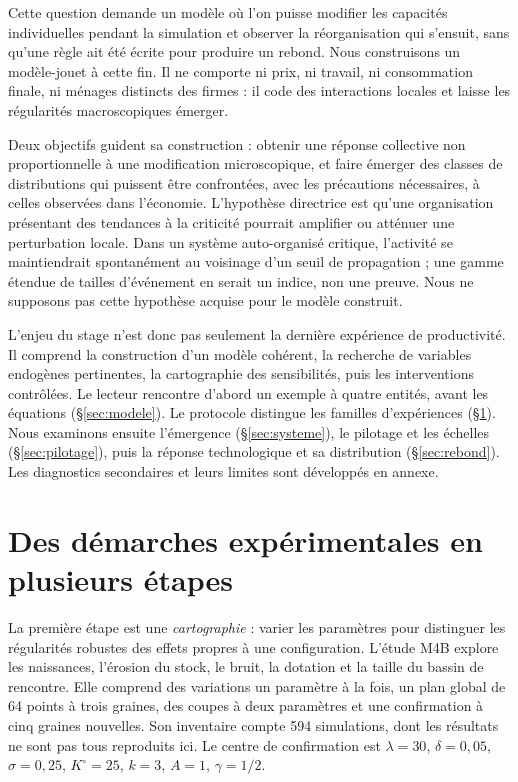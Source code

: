 Cette question demande un modèle où l'on puisse modifier les capacités
individuelles pendant la simulation et observer la réorganisation qui
s'ensuit, sans qu'une règle ait été écrite pour produire un rebond. Nous
construisons un modèle-jouet à cette fin. Il ne comporte ni prix, ni travail,
ni consommation finale, ni ménages distincts des firmes : il code des
interactions locales et laisse les régularités macroscopiques émerger.

Deux objectifs guident sa construction : obtenir une réponse collective
non proportionnelle à une modification microscopique, et faire émerger des
classes de distributions qui puissent être confrontées, avec les précautions
nécessaires, à celles observées dans l'économie. L'hypothèse directrice est
qu'une organisation présentant des tendances à la criticité pourrait amplifier
ou atténuer une perturbation locale. Dans un système auto-organisé critique,
l'activité se maintiendrait spontanément au voisinage d'un seuil de propagation ;
une gamme étendue de tailles d'événement en serait un indice, non une preuve.
Nous ne supposons pas cette hypothèse acquise pour le modèle construit.

L'enjeu du stage n'est donc pas seulement la dernière expérience de
productivité. Il comprend la construction d'un modèle cohérent,
la recherche de variables endogènes pertinentes,
la cartographie des sensibilités, puis les interventions contrôlées.
Le lecteur rencontre d'abord un exemple à quatre entités, avant les équations
(§\ref{sec:modele}). Le protocole distingue les familles d'expériences
(§\ref{sec:protocole}). Nous examinons ensuite l'émergence
(§\ref{sec:systeme}), le pilotage et les échelles (§\ref{sec:pilotage}),
puis la réponse technologique et sa distribution (§\ref{sec:rebond}).
Les diagnostics secondaires et leurs limites sont développés en annexe.



\section{Des démarches expérimentales en plusieurs étapes}\label{sec:protocole}
La première étape est une \emph{cartographie} : varier les paramètres pour
distinguer les régularités robustes des effets propres à une configuration.
L'étude M4B explore les naissances, l'érosion du stock, le bruit, la dotation
et la taille du bassin de rencontre. Elle comprend des variations un paramètre
à la fois, un plan global de 64 points à trois graines, des coupes à deux
paramètres et une confirmation à cinq graines nouvelles. Son inventaire
compte 594 simulations, dont les résultats ne sont pas tous reproduits ici.
Le centre de confirmation est $\lambda=30$, $\delta=0{,}05$,
$\sigma=0{,}25$, $K^\circ=25$, $k=3$, $A=1$, $\gamma=1/2$.

